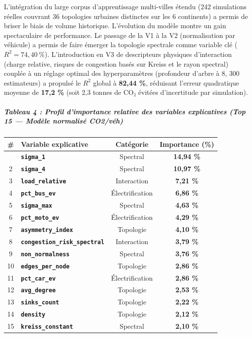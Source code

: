 \documentclass[10pt, a4paper]{article}
\newcounter{none}
\begin{document}
L'intégration du large corpus d'apprentissage multi-villes étendu (242
simulations réelles couvrant 36 topologies urbaines distinctes sur les 6
continents) a permis de briser le biais de volume historique.
L'évolution du modèle montre un gain spectaculaire de performance. Le
passage de la V1 à la V2 (normalisation par véhicule) a permis de faire
émerger la topologie spectrale comme variable clé (\(R^2 = 74,40\ \%\)).
L'introduction en V3 de descripteurs physiques d'interaction (charge
relative, risques de congestion basés sur Kreiss et le rayon spectral)
couplée à un réglage optimal des hyperparamètres (profondeur d'arbre à
8, 300 estimateurs) a propulsé le \(R^2\) global à \textbf{82,44 \%},
réduisant l'erreur quadratique moyenne de \textbf{17,2 \%} (soit 2,3
tonnes de CO₂ évitées d'incertitude par simulation).

\subparagraph{Tableau 4 : Profil d'importance relative des variables
explicatives (Top 15 --- Modèle normalisé
CO2/véh)}\label{tableau-4-profil-dimportance-relative-des-variables-explicatives-top-15-moduxe8le-normalisuxe9-co2vuxe9h}

{\def\LTcaptype{none} %
\begin{longtable}[]{@{}clcc@{}}
\toprule\noalign{}
\# & Variable explicative & Catégorie & Importance (\%) \\
\midrule\noalign{}
\endhead
\bottomrule\noalign{}
\endlastfoot
1 & \textbf{\texttt{sigma\_1}} & Spectral & \textbf{14,94 \%} \\
2 & \textbf{\texttt{sigma\_4}} & Spectral & \textbf{10,97 \%} \\
3 & \textbf{\texttt{load\_relative}} & Interaction & \textbf{7,21 \%} \\
4 & \textbf{\texttt{pct\_bus\_ev}} & Électrification & \textbf{6,86
\%} \\
5 & \textbf{\texttt{sigma\_max}} & Spectral & \textbf{4,63 \%} \\
6 & \textbf{\texttt{pct\_moto\_ev}} & Électrification & \textbf{4,29
\%} \\
7 & \textbf{\texttt{asymmetry\_index}} & Topologie & \textbf{4,10 \%} \\
8 & \textbf{\texttt{congestion\_risk\_spectral}} & Interaction &
\textbf{3,79 \%} \\
9 & \textbf{\texttt{non\_normalness}} & Spectral & \textbf{3,76 \%} \\
10 & \textbf{\texttt{edges\_per\_node}} & Topologie & \textbf{2,86
\%} \\
11 & \textbf{\texttt{pct\_car\_ev}} & Électrification & \textbf{2,86
\%} \\
12 & \textbf{\texttt{avg\_degree}} & Topologie & \textbf{2,53 \%} \\
13 & \textbf{\texttt{sinks\_count}} & Topologie & \textbf{2,22 \%} \\
14 & \textbf{\texttt{density}} & Topologie & \textbf{2,12 \%} \\
15 & \textbf{\texttt{kreiss\_constant}} & Spectral & \textbf{2,10 \%} \\
\end{longtable}
}
\end{document}

